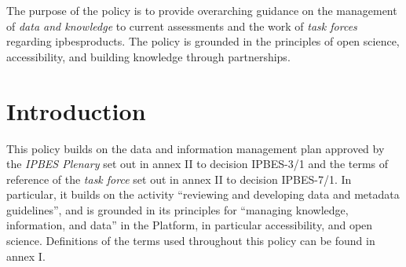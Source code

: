 \documentclass{article}
\begin{document}
The purpose of the policy is to provide overarching guidance on the management of \textit{data and knowledge }to current assessments and the work of \textit{task forces} regarding \gls{ipbesproducts}. The policy is grounded in the principles of open science, accessibility, and building knowledge through partnerships.

\section{Introduction}

This policy builds on the data and information management plan approved by the \textit{IPBES Plenary} set out in annex II to decision IPBES-3/1 and the terms of reference of the \textit{task force} set out in annex II to decision IPBES-7/1. In particular, it builds on the activity “reviewing and developing data and metadata guidelines”, and is grounded in its principles for “managing knowledge, information, and data” in the Platform, in particular accessibility, and open science. Definitions of the terms used throughout this policy can be found in annex I.
\end{document}
